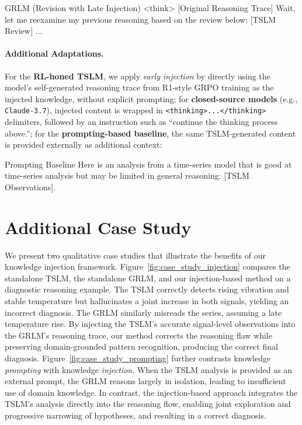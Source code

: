 \documentclass[twoside]{article}
\begin{document}
\begin{promptbox}{GRLM (Revision with Late Injection)}
<think>  
[Original Reasoning Trace]  
Wait, let me reexamine my previous reasoning based on the review below:  
[TSLM Review]  
...
\end{promptbox}

\paragraph{Additional Adaptations.}

For the \textbf{RL-honed TSLM}, we apply \emph{early injection} by directly using the model’s self-generated reasoning trace from R1-style GRPO training as the injected knowledge, without explicit prompting; for \textbf{closed-source models} (e.g., \texttt{Claude-3.7}), injected content is wrapped in \texttt{<thinking>...</thinking>} delimiters, followed by an instruction such as “continue the thinking process above.”; for the \textbf{prompting-based baseline}, the same TSLM-generated content is provided externally as additional context:  

\begin{promptbox}{Prompting Baseline}
Here is an analysis from a time-series model that is good at time-series analysis  
but may be limited in general reasoning: [TSLM Observations].  
\end{promptbox}

\section{Additional Case Study}
\label{app:case_study}
\label{app:inject_over_prompt}

We present two qualitative case studies that illustrate the benefits of our knowledge injection framework. Figure~\ref{fig:case_study_injection} compares the standalone TSLM, the standalone GRLM, and our injection-based method on a diagnostic reasoning example. The TSLM correctly detects rising vibration and stable temperature but hallucinates a joint increase in both signals, yielding an incorrect diagnosis. The GRLM similarly misreads the series, assuming a late temperature rise. By injecting the TSLM’s accurate signal-level observations into the GRLM’s reasoning trace, our method corrects the reasoning flaw while preserving domain-grounded pattern recognition, producing the correct final diagnosis. Figure~\ref{fig:case_study_prompting} further contrasts knowledge \emph{prompting} with knowledge \emph{injection}. When the TSLM analysis is provided as an external prompt, the GRLM reasons largely in isolation, leading to insufficient use of domain knowledge. In contrast, the injection-based approach integrates the TSLM’s analysis directly into the reasoning flow, enabling joint exploration and progressive narrowing of hypotheses, and resulting in a correct diagnosis.
\end{document}
